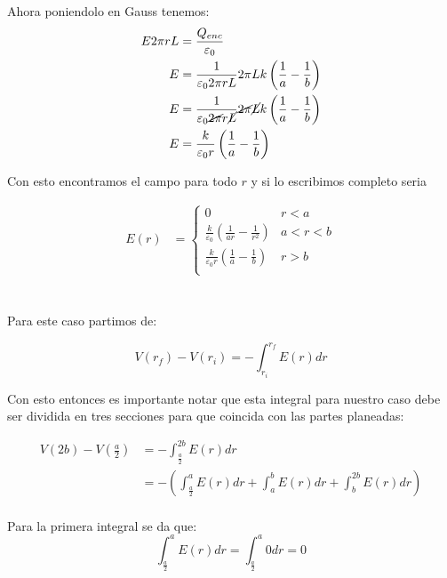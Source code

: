 \documentclass{report}
\begin{document}
Ahora poniendolo en Gauss tenemos:
\begin{align*}
	E 2 \pi r L &= \frac{Q_{enc}}{\varepsilon_0}\\
	E &= \frac{1}{\varepsilon_0 2\pi r L}2\pi L k \left(\frac{1}{a} - \frac{1}{b}\right)\\
	E &= \frac{1}{\varepsilon_0 \cancel{2\pi} r \cancel{L}}\cancel{2\pi} \cancel{L} k \left(\frac{1}{a} - \frac{1}{b}\right)\\
	E &= \frac{k}{\varepsilon_0 r} \left(\frac{1}{a} - \frac{1}{b}\right)\\
\end{align*}

Con esto encontramos el campo para todo $r$ y si lo escribimos completo seria

\begin{align*}
	E(r) &= \begin{cases}0 & r < a\\
		\frac{k}{\varepsilon_0} \left(\frac{1}{ar} - \frac{1}{r^2}\right) & a < r < b\\
		\frac{k}{\varepsilon_0 r} \left(\frac{1}{a} - \frac{1}{b}\right) & r > b\\
	\end{cases}
\end{align*}

\section{}

Para este caso partimos de:

\[
	V(r_f) - V(r_i) = - \int_{r_i}^{r_f} E(r) dr
\]

Con esto entonces es importante notar que esta integral para nuestro caso debe ser dividida en tres secciones para que coincida con las partes planeadas:

\begin{align*}
	V(2b) - V\left(\frac{a}{2}\right) &= - \int_{\frac{a}{2}}^{2b} E(r) dr\\
	&= - \left(\int_{\frac{a}{2}}^{a} E(r) dr + \int_{a}^{b} E(r) dr + \int_{b}^{2b} E(r) dr\right)\\
\end{align*}

Para la primera integral se da que:
$$
	\int_{\frac{a}{2}}^{a} E(r) dr = \int_{\frac{a}{2}}^{a} 0 dr = 0
$$
\end{document}
